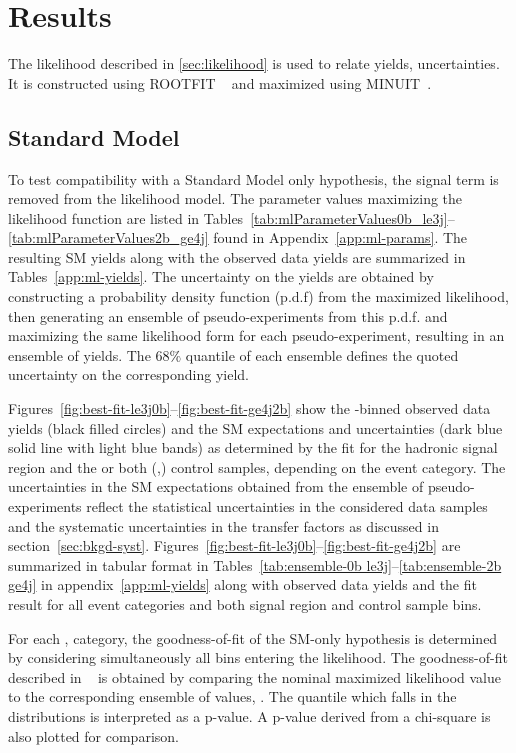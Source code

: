 \clearpage
\section{Results\label{sec:results}}

The likelihood described in \ref{sec:likelihood} is used to
relate yields, uncertainties. It is constructed using ROOTFIT
~\cite{roofit} and maximized using MINUIT~\cite{James:1975dr}.

\subsection{Standard Model\label{sec:smInterp}}

To test compatibility with a Standard Model only hypothesis,
the signal term is removed from the likelihood model. The parameter values 
maximizing the likelihood function are listed in 
Tables~\ref{tab:mlParameterValues0b_le3j}--\ref{tab:mlParameterValues2b_ge4j}
found in Appendix~\ref{app:ml-params}. The resulting SM yields
along with the observed data yields are summarized in Tables~\ref{app:ml-yields}. 
The uncertainty on the yields are obtained by constructing a probability density
function (p.d.f) from the maximized likelihood, then generating an
ensemble of pseudo-experiments from this p.d.f. and maximizing the same 
likelihood form for each pseudo-experiment, resulting in an ensemble of yields.
The $68\%$ quantile of each ensemble defines the quoted uncertainty on the 
corresponding yield.

Figures~\ref{fig:best-fit-le3j0b}--\ref{fig:best-fit-ge4j2b} show
the \scalht-binned observed data yields (black filled circles) and the
SM expectations and uncertainties (dark blue solid line with light
blue bands) as determined by the fit for the hadronic signal region
and the \mj or both (\mj,\gj) control samples, depending on the event
category. The uncertainties in the SM expectations obtained from the 
ensemble of pseudo-experiments reflect the statistical uncertainties in
the considered data samples and the systematic uncertainties
in the transfer factors as discussed in section~\ref{sec:bkgd-syst}.
Figures~\ref{fig:best-fit-le3j0b}--\ref{fig:best-fit-ge4j2b} are summarized
in tabular format in Tables~\ref{tab:ensemble-0b le3j}--\ref{tab:ensemble-2b ge4j} 
in appendix~\ref{app:ml-yields} along with observed data yields and the fit 
result for all event categories and both signal region and control sample bins.

For each \nb, \njet category, the goodness-of-fit of the SM-only hypothesis 
is determined by considering simultaneously all \scalht bins entering
the likelihood. The goodness-of-fit described in ~\cite{Cowan:358560} is obtained
by comparing the nominal maximized likelihood value  to 
the corresponding ensemble of values, . The quantile which 
falls in the distributions is interpreted as a p-value.  A p-value derived from
a chi-square is also plotted for comparison. 


